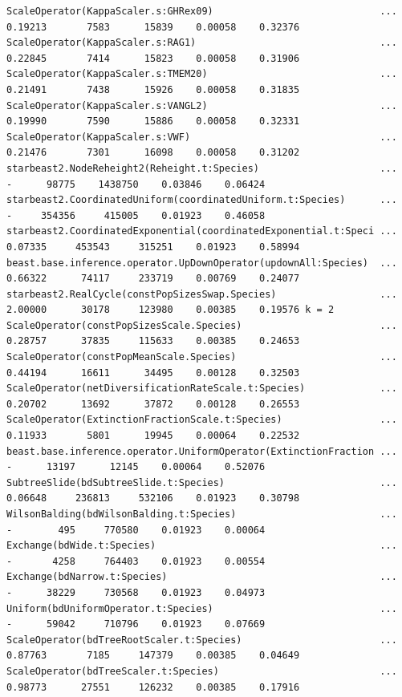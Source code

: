 \documentclass[12pt]{article}
\begin{document}
\begin{verbatim}
ScaleOperator(KappaScaler.s:GHRex09)                             ... 0.19213       7583      15839    0.00058    0.32376 
ScaleOperator(KappaScaler.s:RAG1)                                ... 0.22845       7414      15823    0.00058    0.31906 
ScaleOperator(KappaScaler.s:TMEM20)                              ... 0.21491       7438      15926    0.00058    0.31835 
ScaleOperator(KappaScaler.s:VANGL2)                              ... 0.19990       7590      15886    0.00058    0.32331 
ScaleOperator(KappaScaler.s:VWF)                                 ... 0.21476       7301      16098    0.00058    0.31202 
starbeast2.NodeReheight2(Reheight.t:Species)                     ...       -      98775    1438750    0.03846    0.06424 
starbeast2.CoordinatedUniform(coordinatedUniform.t:Species)      ...       -     354356     415005    0.01923    0.46058 
starbeast2.CoordinatedExponential(coordinatedExponential.t:Speci ... 0.07335     453543     315251    0.01923    0.58994 
beast.base.inference.operator.UpDownOperator(updownAll:Species)  ... 0.66322      74117     233719    0.00769    0.24077 
starbeast2.RealCycle(constPopSizesSwap.Species)                  ... 2.00000      30178     123980    0.00385    0.19576 k = 2
ScaleOperator(constPopSizesScale.Species)                        ... 0.28757      37835     115633    0.00385    0.24653 
ScaleOperator(constPopMeanScale.Species)                         ... 0.44194      16611      34495    0.00128    0.32503 
ScaleOperator(netDiversificationRateScale.t:Species)             ... 0.20702      13692      37872    0.00128    0.26553 
ScaleOperator(ExtinctionFractionScale.t:Species)                 ... 0.11933       5801      19945    0.00064    0.22532 
beast.base.inference.operator.UniformOperator(ExtinctionFraction ...       -      13197      12145    0.00064    0.52076 
SubtreeSlide(bdSubtreeSlide.t:Species)                           ... 0.06648     236813     532106    0.01923    0.30798 
WilsonBalding(bdWilsonBalding.t:Species)                         ...       -        495     770580    0.01923    0.00064 
Exchange(bdWide.t:Species)                                       ...       -       4258     764403    0.01923    0.00554 
Exchange(bdNarrow.t:Species)                                     ...       -      38229     730568    0.01923    0.04973 
Uniform(bdUniformOperator.t:Species)                             ...       -      59042     710796    0.01923    0.07669 
ScaleOperator(bdTreeRootScaler.t:Species)                        ... 0.87763       7185     147379    0.00385    0.04649
ScaleOperator(bdTreeScaler.t:Species)                            ... 0.98773      27551     126232    0.00385    0.17916 


\end{verbatim}
\end{document}
